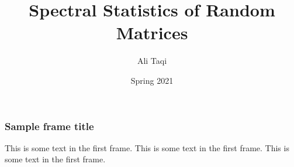 \documentclass{beamer}
\title{Spectral Statistics of Random Matrices}
\author{Ali Taqi}
\institute{Reed College}
\date{Spring 2021}
\begin{document}
\frame{\titlepage}

\begin{frame}
\frametitle{Sample frame title}
This is some text in the first frame. This is some text in the first frame. This is some text in the first frame.
\end{frame}
\end{document}
